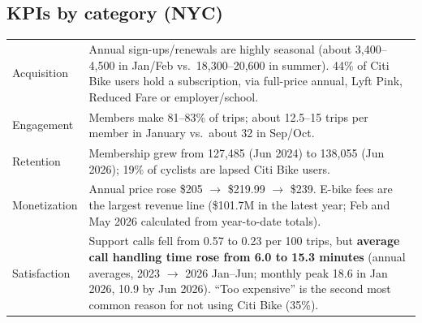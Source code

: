 \documentclass[11pt,a4paper]{article}
\begin{document}
\subsection*{KPIs by category (NYC)}
\begin{tabularx}{\linewidth}{@{}lL@{}}
\toprule
Acquisition & Annual sign-ups/renewals are highly seasonal (about 3,400--4,500 in Jan/Feb vs.\ 18,300--20,600 in summer). 44\% of Citi Bike users hold a subscription, via full-price annual, Lyft Pink, Reduced Fare or employer/school. \\
Engagement & Members make 81--83\% of trips; about 12.5--15 trips per member in January vs.\ about 32 in Sep/Oct. \\
Retention & Membership grew from 127{,}485 (Jun 2024) to 138{,}055 (Jun 2026); 19\% of cyclists are lapsed Citi Bike users. \\
Monetization & Annual price rose \$205 $\rightarrow$ \$219.99 $\rightarrow$ \$239. E-bike fees are the largest revenue line (\$101.7M in the latest year; Feb and May 2026 calculated from year-to-date totals). \\
Satisfaction & Support calls fell from 0.57 to 0.23 per 100 trips, but \textbf{average call handling time rose from 6.0 to 15.3 minutes} (annual averages, 2023 $\rightarrow$ 2026 Jan--Jun; monthly peak 18.6 in Jan 2026, 10.9 by Jun 2026). ``Too expensive'' is the second most common reason for not using Citi Bike (35\%). \\
\bottomrule
\end{tabularx}
\end{document}
